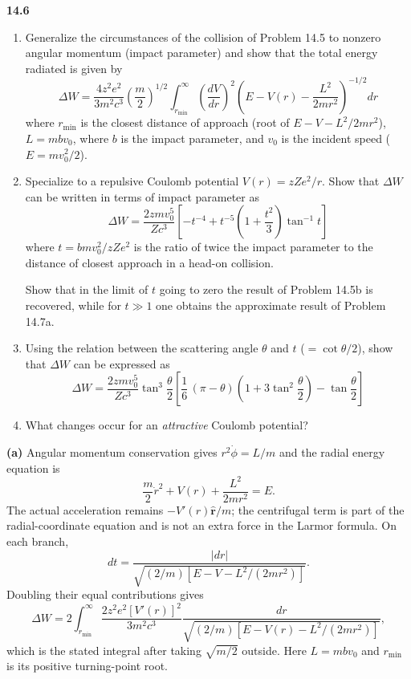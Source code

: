 \par\bigskip
\noindent\textbf{14.6}\quad\begin{enumerate}
\item[(a)] Generalize the circumstances of the collision of Problem 14.5 to nonzero angular momentum (impact parameter) and show that the total energy radiated is given by
\[
\Delta W=\frac{4z^{2}e^{2}}{3m^{2}c^{3}}\left(\frac{m}{2}\right)^{1/2}\int_{r_{\min}}^{\infty}\left(\frac{dV}{dr}\right)^{2}\!\left(E-V(r)-\frac{L^{2}}{2mr^{2}}\right)^{-1/2}dr
\]
where $r_{\min}$ is the closest distance of approach (root of $E-V-L^{2}/2mr^{2}$), $L=mbv_{0}$, where $b$ is the impact parameter, and $v_{0}$ is the incident speed ($E=mv_{0}^{2}/2$).
\item[(b)] Specialize to a repulsive Coulomb potential $V(r)=zZe^{2}/r$. Show that $\Delta W$ can be written in terms of impact parameter as
\[
\Delta W=\frac{2zmv_{0}^{5}}{Zc^{3}}\left[-t^{-4}+t^{-5}\!\left(1+\frac{t^{2}}{3}\right)\tan^{-1}t\right]
\]
where $t=bmv_{0}^{2}/zZe^{2}$ is the ratio of twice the impact parameter to the distance of closest approach in a head-on collision.

Show that in the limit of $t$ going to zero the result of Problem 14.5b is recovered, while for $t\gg1$ one obtains the approximate result of Problem 14.7a.
\item[(c)] Using the relation between the scattering angle $\theta$ and $t$ ($=\cot\theta/2$), show that $\Delta W$ can be expressed as
\[
\Delta W=\frac{2zmv_{0}^{5}}{Zc^{3}}\tan^{3}\frac{\theta}{2}\left[\frac{1}{6}\,(\pi-\theta)\!\left(1+3\tan^{2}\frac{\theta}{2}\right)-\tan\frac{\theta}{2}\right]
\]
\item[(d)] What changes occur for an \emph{attractive} Coulomb potential?
\end{enumerate}
\solution

\textbf{(a)} Angular momentum conservation gives
$r^2\dot\phi=L/m$ and the radial energy equation is
\[
\frac m2\dot r^2+V(r)+\frac{L^2}{2mr^2}=E.
\]
The actual acceleration remains $-V'(r)\hat{\mathbf r}/m$; the
centrifugal term is part of the radial-coordinate equation and is not
an extra force in the Larmor formula. On each branch,
\[
dt=\frac{|dr|}{\sqrt{(2/m)[E-V-L^2/(2mr^2)]}}.
\]
Doubling their equal contributions gives
\[
\Delta W=2\int_{r_{\min}}^\infty
\frac{2z^2e^2[V'(r)]^2}{3m^2c^3}
\frac{dr}{\sqrt{(2/m)[E-V(r)-L^2/(2mr^2)]}},
\]
which is the stated integral after taking $\sqrt{m/2}$ outside.
Here $L=mbv_0$ and $r_{\min}$ is its positive turning-point root.

